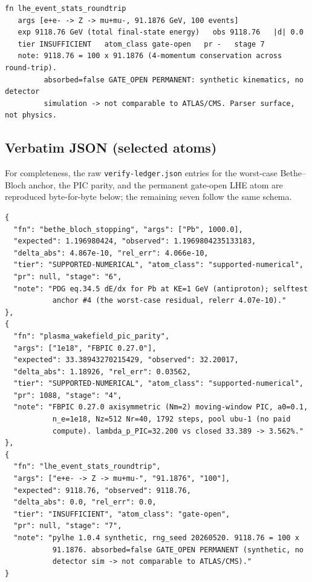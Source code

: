 \begin{lstlisting}
fn lhe_event_stats_roundtrip
   args [e+e- -> Z -> mu+mu-, 91.1876 GeV, 100 events]
   exp 9118.76 GeV (total final-state energy)   obs 9118.76   |d| 0.0
   tier INSUFFICIENT   atom_class gate-open   pr -   stage 7
   note: 9118.76 = 100 x 91.1876 (4-momentum conservation across round-trip).
         absorbed=false GATE_OPEN PERMANENT: synthetic kinematics, no detector
         simulation -> not comparable to ATLAS/CMS. Parser surface, not physics.
\end{lstlisting}

\subsection{Verbatim JSON (selected atoms)}
\label{app:vl-json}

For completeness, the raw \texttt{verify-ledger.json} entries for the
worst-case Bethe--Bloch anchor, the PIC parity, and the permanent
gate-open LHE atom are reproduced byte-for-byte below; the remaining
seven follow the same schema.

\begin{lstlisting}
{
  "fn": "bethe_bloch_stopping", "args": ["Pb", 1000.0],
  "expected": 1.196980424, "observed": 1.1969804235133183,
  "delta_abs": 4.867e-10, "rel_err": 4.066e-10,
  "tier": "SUPPORTED-NUMERICAL", "atom_class": "supported-numerical",
  "pr": null, "stage": "6",
  "note": "PDG eq.34.5 dE/dx for Pb at KE=1 GeV (antiproton); selftest
           anchor #4 (the worst-case residual, relerr 4.07e-10)."
},
{
  "fn": "plasma_wakefield_pic_parity",
  "args": ["1e18", "FBPIC 0.27.0"],
  "expected": 33.38943270215429, "observed": 32.20017,
  "delta_abs": 1.18926, "rel_err": 0.03562,
  "tier": "SUPPORTED-NUMERICAL", "atom_class": "supported-numerical",
  "pr": 1088, "stage": "4",
  "note": "FBPIC 0.27.0 axisymmetric (Nm=2) moving-window PIC, a0=0.1,
           n_e=1e18, Nz=512 Nr=40, 1792 steps, pool ubu-1 (no paid
           compute). lambda_p_PIC=32.200 vs closed 33.389 -> 3.562%."
},
{
  "fn": "lhe_event_stats_roundtrip",
  "args": ["e+e- -> Z -> mu+mu-", "91.1876", "100"],
  "expected": 9118.76, "observed": 9118.76,
  "delta_abs": 0.0, "rel_err": 0.0,
  "tier": "INSUFFICIENT", "atom_class": "gate-open",
  "pr": null, "stage": "7",
  "note": "pylhe 1.0.4 synthetic, rng_seed 20260520. 9118.76 = 100 x
           91.1876. absorbed=false GATE_OPEN PERMANENT (synthetic, no
           detector sim -> not comparable to ATLAS/CMS)."
}
\end{lstlisting}

